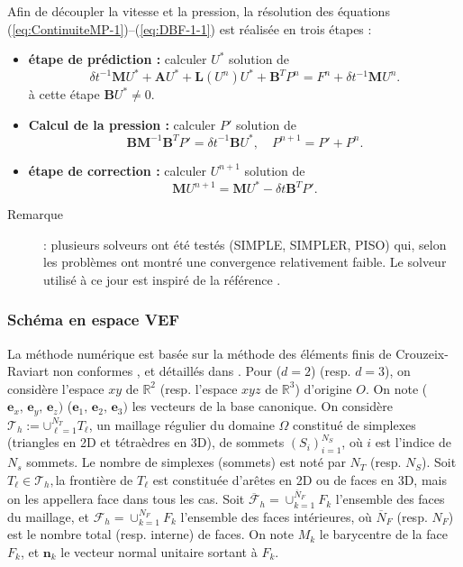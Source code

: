 Afin de d\'ecoupler la vitesse et la pression, la r\'esolution des \'equations
(\ref{eq:ContinuiteMP-1})--(\ref{eq:DBF-1-1}) est r\'ealis\'ee en trois
\'etapes \cite{Chor68,Tema68}: 
\begin{itemize}
\item \textbf{\'etape de pr\'ediction :} calculer $U^{*}$ solution de 
\[
{\delta t}^{-1}\mathbf{M}U^{*}+\mathbf{A}U^{*}+\mathbf{L}(U^{n})U^{*}+\mathbf{B}^{T}P^{n}=F^{n}+\delta t^{-1}\mathbf{M}U^{n}.
\]
\`a cette \'etape $\mathbf{B}U^{*}\neq0$. 
\item \textbf{Calcul de la pression :} calculer $P'$ solution de 
\[
\mathbf{B}\mathbf{M}^{-1}\mathbf{B}^{T}P'={\delta t}^{-1}\mathbf{B}U^{*},\quad P^{n+1}=P'+P^{n}.
\]

\item \textbf{\'etape de correction :} calculer $U^{n+1}$ solution de 
\[
\mathbf{M}U^{n+1}=\mathbf{M}U^{*}-{\delta t}\mathbf{B}^{T}P'.
\]
\end{itemize}
\begin{description}
\item [{Remarque}] : plusieurs solveurs ont \'et\'e test\'es (SIMPLE, SIMPLER,
PISO) qui, selon les probl\`emes ont montr\'e une convergence relativement
faible. Le solveur utilis\'e \`a ce jour est inspir\'e de la r\'ef\'erence \cite{Guermond-Quartapelle_IJNMF1998}.
\end{description}

\subsubsection{Sch\'ema en espace VEF }

La m\'ethode num\'erique est bas\'ee sur la m\'ethode des \'el\'ements finis de
Crouzeix-Raviart non conformes \cite{CrRa73}, et d\'etaill\'es dans \cite{Emon92,Heib03,Fort06,Angeli_etal_FVCA2017}.
Pour ($d=2$) (resp. $d=3$), on consid\`ere l'espace $xy$ de $\mathbb{R}^{2}$
(resp. l'espace $xyz$ de $\mathbb{R}^{3}$) d'origine $O$. On note
($\mathbf{e}_{x},\,\mathbf{e}_{y},\,\mathbf{e}_{z})$ ($\mathbf{e}_{1},\,\mathbf{e}_{2},\,\mathbf{e}_{3})$
les vecteurs de la base canonique. On consid\`ere $\mathcal{T}_{h}:={\displaystyle \cup}{}_{\ell=1}^{N_{T}}T_{\ell}$,
un maillage r\'egulier du domaine $\Omega$ constitu\'e de simplexes (triangles
en 2D et t\'etra\`edres en 3D), de sommets $(S_{i})_{i=1}^{N_{S}}$, o\`u
$i$ est l'indice de $N_{s}$ sommets. Le nombre de simplexes (sommets)
est not\'e par $N_{T}$ (resp. $N_{S}$). Soit $T_{\ell}\in\mathcal{T}_{h},$la
fronti\`ere de $T_{\ell}$ est constitu\'ee d'ar\^etes en 2D ou de faces
en 3D, mais on les appellera \og face \fg{} dans tous les cas. Soit
$\overline{\mathcal{F}}_{h}=\cup_{k=1}^{\overline{N}_{F}}F_{k}$ l'ensemble
des faces du maillage, et $\mathcal{F}_{h}=\cup_{k=1}^{N_{F}}F_{k}$
l'ensemble des faces int\'erieures, o\`u $\overline{N}_{F}$ (resp. $N_{F}$)
est le nombre total (resp. interne) de faces. On note $M_{k}$ le
barycentre de la face $F_{k}$, et $\mathbf{n}_{k}$ le vecteur normal
unitaire sortant \`a $F_{k}$.

